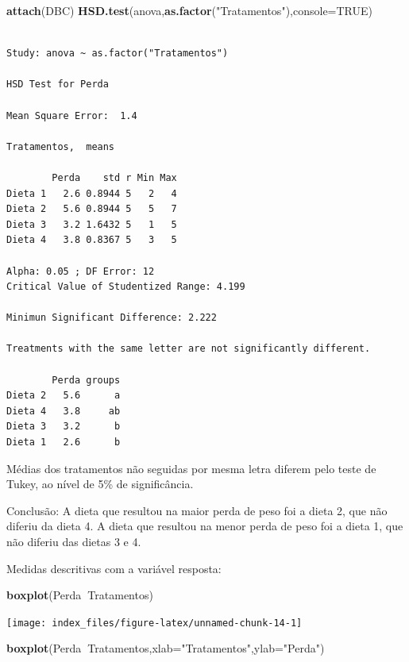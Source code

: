 \documentclass[12pt,brazil,oneside]{book}
\newenvironment{Shaded}{\begin{snugshade}}{\end{snugshade}}
\newcommand{\DataTypeTok}[1]{\textcolor[rgb]{0.13,0.29,0.53}{#1}}
\newcommand{\KeywordTok}[1]{\textcolor[rgb]{0.13,0.29,0.53}{\textbf{#1}}}
\newcommand{\NormalTok}[1]{#1}
\newcommand{\OperatorTok}[1]{\textcolor[rgb]{0.81,0.36,0.00}{\textbf{#1}}}
\newcommand{\OtherTok}[1]{\textcolor[rgb]{0.56,0.35,0.01}{#1}}
\newcommand{\StringTok}[1]{\textcolor[rgb]{0.31,0.60,0.02}{#1}}
\begin{document}
\begin{Shaded}
\begin{Highlighting}[]
\KeywordTok{attach}\NormalTok{(DBC)}
\KeywordTok{HSD.test}\NormalTok{(anova,}\KeywordTok{as.factor}\NormalTok{(}\StringTok{"Tratamentos"}\NormalTok{),}\DataTypeTok{console=}\OtherTok{TRUE}\NormalTok{)}
\end{Highlighting}
\end{Shaded}

\begin{verbatim}

Study: anova ~ as.factor("Tratamentos")

HSD Test for Perda 

Mean Square Error:  1.4 

Tratamentos,  means

        Perda    std r Min Max
Dieta 1   2.6 0.8944 5   2   4
Dieta 2   5.6 0.8944 5   5   7
Dieta 3   3.2 1.6432 5   1   5
Dieta 4   3.8 0.8367 5   3   5

Alpha: 0.05 ; DF Error: 12 
Critical Value of Studentized Range: 4.199 

Minimun Significant Difference: 2.222 

Treatments with the same letter are not significantly different.

        Perda groups
Dieta 2   5.6      a
Dieta 4   3.8     ab
Dieta 3   3.2      b
Dieta 1   2.6      b
\end{verbatim}

Médias dos tratamentos não seguidas por mesma letra diferem pelo teste
de Tukey, ao nível de 5\% de significância.

Conclusão: A dieta que resultou na maior perda de peso foi a dieta 2,
que não diferiu da dieta 4. A dieta que resultou na menor perda de peso
foi a dieta 1, que não diferiu das dietas 3 e 4.

Medidas descritivas com a variável resposta:

\begin{Shaded}
\begin{Highlighting}[]
\KeywordTok{boxplot}\NormalTok{(Perda}\OperatorTok{~}\NormalTok{Tratamentos)}
\end{Highlighting}
\end{Shaded}

\begin{center}\texttt{[image: index\_files/figure-latex/unnamed-chunk-14-1]} \end{center}

\begin{Shaded}
\begin{Highlighting}[]
\KeywordTok{boxplot}\NormalTok{(Perda}\OperatorTok{~}\NormalTok{Tratamentos,}\DataTypeTok{xlab=}\StringTok{"Tratamentos"}\NormalTok{,}\DataTypeTok{ylab=}\StringTok{"Perda"}\NormalTok{)}
\end{Highlighting}
\end{Shaded}
\end{document}
